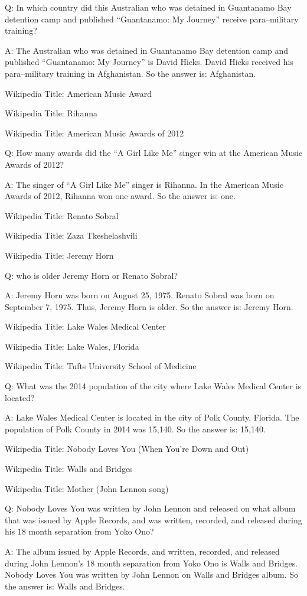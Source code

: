 \documentclass[
]{article}
\begin{document}
Q: In which country did this Australian who was detained in Guantanamo
Bay detention camp and published ``Guantanamo: My Journey'' receive
para--military training?

A: The Australian who was detained in Guantanamo Bay detention camp and
published ``Guantanamo: My Journey'' is David Hicks. David Hicks
received his para--military training in Afghanistan. So the answer is:
Afghanistan.

Wikipedia Title: American Music Award

Wikipedia Title: Rihanna

Wikipedia Title: American Music Awards of 2012

Q: How many awards did the ``A Girl Like Me'' singer win at the American
Music Awards of 2012?

A: The singer of ``A Girl Like Me'' singer is Rihanna. In the American
Music Awards of 2012, Rihanna won one award. So the answer is: one.

Wikipedia Title: Renato Sobral

Wikipedia Title: Zaza Tkeshelashvili

Wikipedia Title: Jeremy Horn

Q: who is older Jeremy Horn or Renato Sobral?

A: Jeremy Horn was born on August 25, 1975. Renato Sobral was born on
September 7, 1975. Thus, Jeremy Horn is older. So the answer is: Jeremy
Horn.

Wikipedia Title: Lake Wales Medical Center

Wikipedia Title: Lake Wales, Florida

Wikipedia Title: Tufts University School of Medicine

Q: What was the 2014 population of the city where Lake Wales Medical
Center is located?

A: Lake Wales Medical Center is located in the city of Polk County,
Florida. The population of Polk County in 2014 was 15,140. So the answer
is: 15,140.

Wikipedia Title: Nobody Loves You (When You're Down and Out)

Wikipedia Title: Walls and Bridges

Wikipedia Title: Mother (John Lennon song)

Q: Nobody Loves You was written by John Lennon and released on what
album that was issued by Apple Records, and was written, recorded, and
released during his 18 month separation from Yoko Ono?

A: The album issued by Apple Records, and written, recorded, and
released during John Lennon's 18 month separation from Yoko Ono is Walls
and Bridges. Nobody Loves You was written by John Lennon on Walls and
Bridges album. So the answer is: Walls and Bridges.
\end{document}
